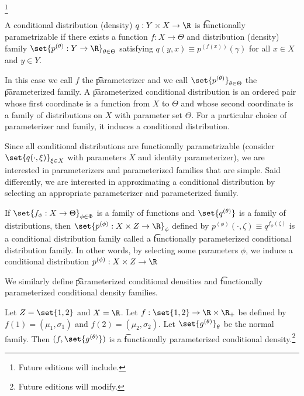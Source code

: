 
\footnote{Future editions will include.}


A conditional distribution (density) $q: Y \times X \to \R$ is \t{functionally parametrizable} if there exists a function $f: X \to \Theta$ and distribution (density) family $\set{p^{(\theta)}: Y \to \R}_{\theta \in \Theta}$ satisfying $q(y, x) \equiv p^{(f(x))}(\gamma)$ for all $x \in X$ and $y \in Y$.

In this case we call $f$ the \t{parameterizer} and we call $\set{p^{(\theta)}}_{\theta \in \Theta}$ the \t{parameterized family}.
A \t{parameterized conditional distribution} is an ordered pair whose first coordinate is a function from $X$ to $\Theta$ and whose second coordinate is a family of distributions on $X$ with parameter set $\Theta$.
For a particular choice of parameterizer and family, it induces a conditional distribution.

Since all conditional distributions are functionally parametrizable (consider $\set{q(\cdot, \xi)}_{\xi \in X}$ with parameters $X$ and identity parameterizer), we are interested in parameterizers and parameterized families that are simple.
Said differently, we are interested in approximating a conditional distribution by selecting an appropriate parameterizer and parameterized family.

If $\set{f_{\phi}: X \to \Theta}_{\phi \in \Phi}$ is a family of functions and $\set{q^{(\theta)}}$ is a family of distributions, then $\set{p^{(\phi)}: X \times Z \to \R}_{\phi}$ defined by $p^{(\phi)}(\cdot, \zeta) \equiv q^{f_\phi(\zeta)}$ is a conditional distribution family called a \t{functionally parameterized conditional distribution family}.
In other words, by selecting some parameters $\phi$, we induce a conditional distribution $p^{(\phi)}: X \times Z \to \R$

We similarly define \t{parameterized conditional densities} and \t{functionally parameterized conditional density families}.


Let $Z = \set{1, 2}$ and $X = \R$. Let $f: \set{1, 2} \to  \R \times \R_+$ be defined by $f(1) = (\mu_1, \sigma_1)$ and $f(2) = (\mu_2, \sigma_2)$.
Let $\set{g^{(\theta)}}_{\theta}$ be the normal family.
Then $(f, \set{g^{(\theta)}})$ is a \t{functionally parameterized conditional density}.\footnote{Future editions will modify.}


\blankpage
